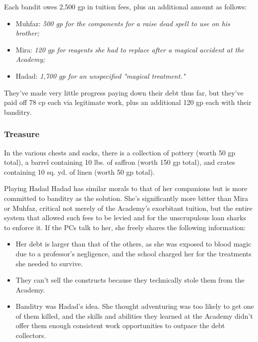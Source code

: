 \documentclass[10pt,a4paper,twoside,bg=print,twocolumn,openany,nodeprecatedcode]{dndbook}
\begin{document}
Each bandit owes 2,500 gp in tuition fees, plus an additional amount as follows:


\begin{itemize}
\item Muhfaz: \textit{500 gp for the components for a \textit{raise dead} spell to use on his brother;}
\item Mira: \textit{120 gp for reagents she had to replace after a magical accident at the Academy;}
\item Hadad: \textit{1,700 gp for an unspecified "magical treatment."}
\end{itemize}

They've made very little progress paying down their debt thus far, but they've paid off 78 cp each via legitimate work, plus an additional 120 gp each with their banditry.

\subsubsection{Treasure}
In the various chests and sacks, there is a collection of pottery (worth 50 gp total), a barrel containing 10 lbs. of saffron (worth 150 gp total), and crates containing 10 sq. yd. of linen (worth 50 gp total).

\begin{DndSidebar}[float=!b]{Playing Hadad}
Hadad has similar morals to that of her companions but is more committed to banditry as the solution. She's significantly more bitter than Mira or Muhfaz, critical not merely of the Academy's exorbitant tuition, but the entire system that allowed such fees to be levied and for the unscrupulous loan sharks to enforce it. If the PCs talk to her, she freely shares the following information:




\begin{itemize}
\item Her debt is larger than that of the others, as she was exposed to blood magic due to a professor's negligence, and the school charged her for the treatments she needed to survive.
\item They can't sell the constructs because they technically stole them from the Academy.
\item Banditry was Hadad's idea. She thought adventuring was too likely to get one of them killed, and the skills and abilities they learned at the Academy didn't offer them enough consistent work opportunities to outpace the debt collectors.
\end{itemize}



\end{DndSidebar}
\end{document}
